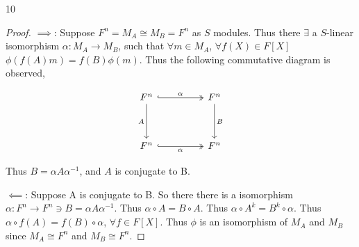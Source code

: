\documentclass{article}
\begin{document}
\bigskip

\begin{PROB}{10}\label{Problem 10.}
\end{PROB}
\begin{proof}
    $\implies$: Suppose $F^n = M_{A} \cong M_{B} = F^n$ as $S$ modules. Thus there $\exists$ a $S$-linear isomorphism $\alpha: M_A \to M_B$, such that $\forall m \in M_A$, $\forall f(X) \in F[X]$ $\phi(f(A) m) = f(B) \phi(m)$. Thus the following commutative diagram is observed, 
    
    
\[\begin{tikzcd}
	{F^n} && {F^n} \\
	\\
	{F^n} && {F^n}
	\arrow["\alpha", hook, two heads, from=1-1, to=1-3]
	\arrow["A"', from=1-1, to=3-1]
	\arrow["B", from=1-3, to=3-3]
	\arrow["\alpha"', hook, two heads, from=3-1, to=3-3]
\end{tikzcd}\]

    Thus $B = \alpha A \alpha^{-1}$, and $A$ is conjugate to B. 
    
    
    $\impliedby$: Suppose A is conjugate to B. So there there is a isomorphism $\alpha: F^n \to F^n \ni B = \alpha A \alpha^{-1}$. Thus $\alpha \circ A = B \circ A$. Thus $\alpha \circ A^k = B^k \circ \alpha$. Thus $\alpha \circ f(A) = f(B) \circ \alpha$, $\forall f\in F[X]$. Thus $\phi$ is an isomorphism of $M_A$ and $M_B$ since $M_A \cong F^n$ and $M_B \cong F^n$.            
\end{proof}
\end{document}
